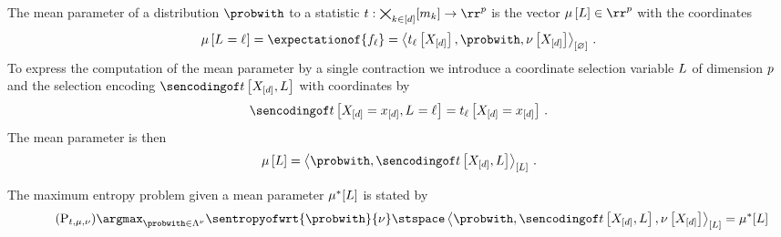 The mean parameter of a distribution $\probwith$ to a statistic $\sstat:\facstates\rightarrow\rr^\seldim$ is the vector $\meanparamwith\in\rr^\seldim$ with the coordinates
\begin{align*}
    \meanparamat{\indexedselvariable}
    = \expectationof{\enumformula}
    = \contraction{\sstatcoordinateofat{\selindex}{\shortcatvariables},\probwith,\basemeasurewith} \, .
\end{align*}
To express the computation of the mean parameter by a single contraction we introduce a coordinate selection variable $L$ of dimension $p$ and the selection encoding $\sencsstatwith$ with coordinates by
\begin{align*}
    \sencsstatat{\indexedshortcatvariables,\indexedselvariable}
    = \sstatcoordinateofat{\selindex}{\indexedshortcatvariables} \, .
\end{align*}
The mean parameter is then
\begin{align*}
    \meanparamwith
    = \contractionof{\probwith,\sencsstatwith}{\selvariable} \, .
\end{align*}

The maximum entropy problem given a mean parameter $\mu^*[L]$ is stated by
\begin{equation}
    \tag{$\mathrm{P}_{\sstat,\meanparam,\basemeasure}$}\label{prob:maxEntropy}
    \argmax_{\probwith\in\distmeasuredby{\basemeasure}} \sentropyofwrt{\probwith}{\basemeasure}
    \stspace
    \contractionof{\probwith,\sencsstatwith,\basemeasurewith}{\selvariable} = \genmeanat{\selvariable}
\end{equation}

\subsection{\ComputationActivationNetworks{}}

